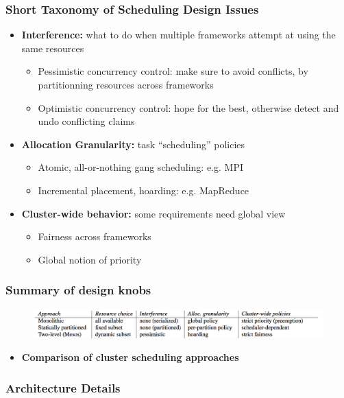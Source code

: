 \begin{frame}\frametitle{Short Taxonomy of Scheduling Design Issues}
\begin{itemize}
	\item {\bf Interference:} what to do when multiple frameworks attempt at using the same resources
	\begin{itemize}
		\item Pessimistic concurrency control: make sure to avoid conflicts, by partitionning resources across frameworks
		\item Optimistic concurrency control: hope for the best, otherwise detect and undo conflicting claims
	\end{itemize}

\vspace{20pt}

	\item {\bf Allocation Granularity: } task ``scheduling'' policies
	\begin{itemize}
		\item Atomic, all-or-nothing gang scheduling: e.g. MPI
		\item Incremental placement, hoarding: e.g. MapReduce
	\end{itemize}

\vspace{20pt}

	\item {\bf Cluster-wide behavior: } some requirements need global view
	\begin{itemize}
		\item Fairness across frameworks
		\item Global notion of priority
	\end{itemize}
\end{itemize}
\end{frame}

\begin{frame}\frametitle{Summary of design knobs}
\begin{figure}[h]
  \includegraphics[scale=0.28]{./figures/intro_design}
  \label{fig:intro_design}
\end{figure}
\begin{itemize}
	\item {\bf Comparison of cluster scheduling approaches}
\end{itemize}
\end{frame}



\begin{frame}\frametitle{Architecture Details}

\end{frame}
